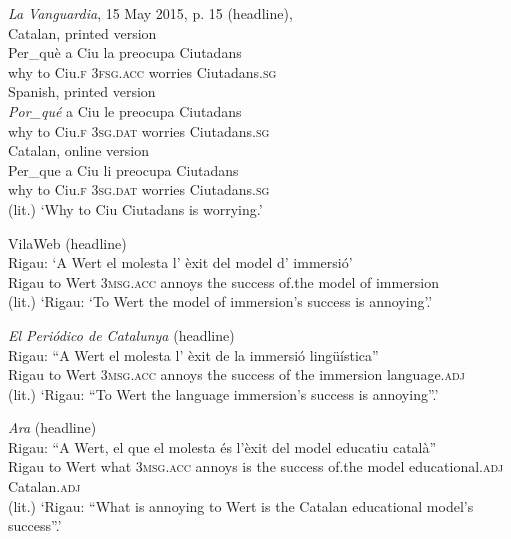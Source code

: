 \documentclass[output=paper,colorlinks,citecolor=brown,modfonts,nonflat]{langsci/langscibook}
\begin{document}
\ea%
 \emph{La} \emph{Vanguardia}, 15 May 2015, p. 15 (headline), 
 \label{ex:royo:5}\\
 \ea Catalan, printed version \label{ex:royo:5a}\\
 \gll Per\_què a Ciu la preocupa Ciutadans \\
why      to Ciu.\textsc{f} 3\textsc{fsg.acc} worries   Ciutadans.\textsc{sg} \\
 
 
 \ex Spanish, printed version \label{ex:royo:5b}\\
 \gll \emph{Por\_qué} a Ciu le preocupa Ciutadans\\
why      to Ciu.\textsc{f} \textsc{3sg.dat} worries    Ciutadans.\textsc{sg}\\
 
 
\ex Catalan, online version \label{ex:royo:5c}\\
 \gll Per\_que a Ciu li preocupa Ciutadans \\
	why      to Ciu.\textsc{f} 3\textsc{sg.dat} worries    Ciutadans.\textsc{sg}\\
 \glt (lit.) ‘Why to Ciu Ciutadans is worrying.’
 
 \z
 \z


\ea%
 \label{ex:royo:6}
 \ea VilaWeb (headline)\\
 \gll Rigau: ‘A Wert el molesta l’ èxit del model d’ immersió’\\
Rigau   to Wert \textsc{3msg.acc} annoys   the success of.the model of immersion\\
 \glt (lit.) ‘Rigau: ‘To Wert the model of immersion’s success is annoying’.’
 
 \ex \textit{El Periódico de Catalunya} (headline)\\
 \gll Rigau: “A Wert el molesta l’ èxit de la immersió lingüística”\\
 Rigau   to Wert 3\textsc{msg.acc} annoys  the success of the immersion language.\textsc{adj}\\
 \glt (lit.) ‘Rigau: “To Wert the language immersion’s success is annoying”.’
 
 \ex \textit{Ara} (headline)\\
 \gll Rigau: “A Wert, el que el molesta és l’èxit del model educatiu català”\\
Rigau    to Wert what   \textsc{3msg.acc} annoys  is the success of.the model educational.\textsc{adj} Catalan.\textsc{adj}\\
 \glt (lit.) ‘Rigau: “What is annoying to Wert is the Catalan educational model’s success”.’ 
 \z
 \z
{}
\end{document}
